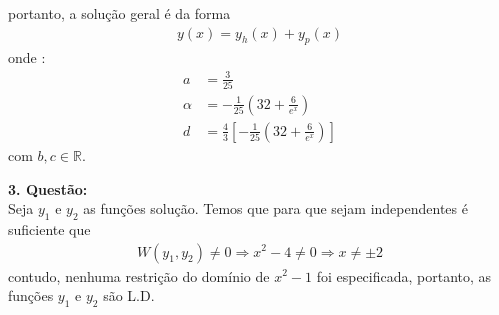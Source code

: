 \documentclass[a4paper,12pt]{article}
\begin{document}
portanto, a solu\c c\~ao geral \'e da forma
\begin{align*}
	y(x) = y_h(x) + y_p(x)
\end{align*}
onde :
\begin{align*}
a &= \frac{3}{25} \\
			{\alpha} &= -\frac{1}{25}\left ( 32 + \frac{6}{e^{x}}\right )  \\
			d &= \frac{4}{3}\left [ -\frac{1}{25}(32 + \frac{6}{e^{x}})\right ] 	
\end{align*}
com $b,c \in \mathbb{R}$.

\textbf{3. Quest\~ao:}\\
Seja $y_1$ e $y_2$ as fun\c c\~oes solu\c c\~ao. Temos que para que sejam independentes \'e suficiente que 
\begin{align*}	
	W(y_1,y_2) \neq 0 \Rightarrow x^{2} - 4 \neq  0 \Rightarrow x \neq \pm 2
\end{align*}
contudo, nenhuma restri\c c\~ao do dom\'inio de $x^{2} - 1$ foi especificada, portanto, as fun\c c\~oes $y_1$ e $y_2$
s\~ao L.D.
\end{document}

